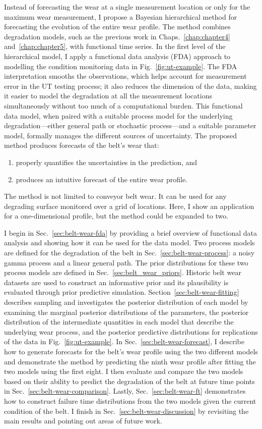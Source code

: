 Instead of forecasting the wear at a single measurement location or only for the maximum wear measurement, I propose a Bayesian hierarchical method for forecasting the evolution of the entire wear profile. The method combines degradation models, such as the previous work in Chaps.~\ref{chap:chapter4} and~\ref{chap:chapter5}, with functional time series. In the first level of the hierarchical model, I apply a functional data analysis (FDA) approach to modelling the condition monitoring data in Fig.~\ref{fig:ut-example}. The FDA interpretation smooths the observations, which helps account for measurement error in the UT testing process; it also reduces the dimension of the data, making it easier to model the degradation at all the measurement locations simultaneously without too much of a computational burden. This functional data model, when paired with a suitable process model for the underlying degradation---either general path or stochastic process---and a suitable parameter model, formally manages the different sources of uncertainty. The proposed method produces forecasts of the belt's wear that:
\begin{enumerate}
  \item properly quantifies the uncertainties in the prediction, and
  \item produces an intuitive forecast of the entire wear profile.
\end{enumerate}
The method is not limited to conveyor belt wear. It can be used for any degrading surface monitored over a grid of locations. Here, I show an application for a one-dimensional profile, but the method could be expanded to two.

I begin in Sec.~\ref{sec:belt-wear-fda} by providing a brief overview of functional data analysis and showing how it can be used for the data model. Two process models are defined for the degradation of the belt in Sec.~\ref{sec:belt-wear-process}: a noisy gamma process and a linear general path. The prior distributions for these two process models are defined in Sec.~\ref{sec:belt_wear_priors}. Historic belt wear datasets are used to construct an informative prior and its plausibility is evaluated through prior predictive simulation. Section~\ref{sec:belt-wear-fitting} describes sampling and investigates the posterior distribution of each model by examining the marginal posterior distributions of the parameters, the posterior distribution of the intermediate quantities in each model that describe the underlying wear process, and the posterior predictive distributions for replications of the data in Fig.~\ref{fig:ut-example}. In Sec.~\ref{sec:belt-wear-forecast}, I describe how to generate forecasts for the belt's wear profile using the two different models and demonstrate the method by predicting the ninth wear profile after fitting the two models using the first eight. I then evaluate and compare the two models based on their ability to predict the degradation of the belt at future time points in Sec.~\ref{sec:belt-wear-comparison}. Lastly, Sec.~\ref{sec:belt-wear-ft} demonstrates how to construct failure time distributions from the two models given the current condition of the belt. I finish in Sec.~\ref{sec:belt-wear-discussion} by revisiting the main results and pointing out areas of future work.

